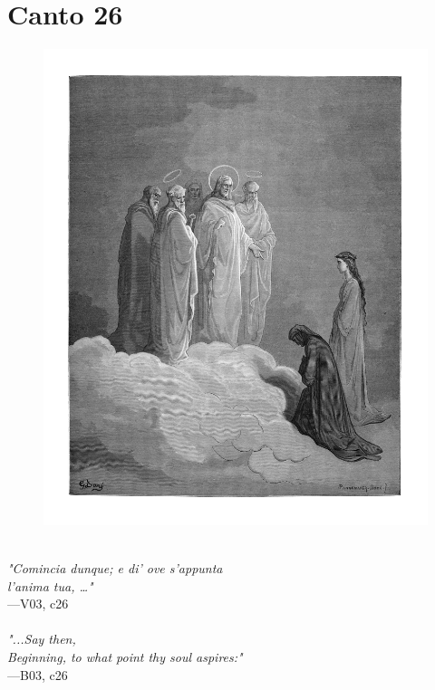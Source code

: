 \documentclass[../Dore_vision.tex]{subfiles}
\begin{document}
\newpage

\section{Canto 26}

\begin{figure}[ht]
\centering
\includegraphics[height=\figsize]{illustrations/book_3/V03, c26.jpg}
\end{figure}

\begin{center}
\begin{minipage}{0.8\linewidth}
\textit{\\
"Comincia dunque; e di’ ove s’appunta\\l’anima tua, …"} \\
—V03, c26 \\~\\
\textit{"...Say then,\\Beginning, to what point thy soul aspires:"} \\
—B03, c26
\end{minipage}
\end{center}
\end{document}

